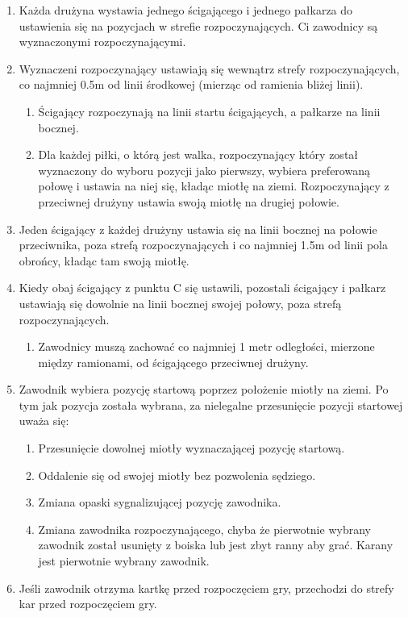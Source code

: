 \documentclass[11pt,a4paper]{article}
\begin{document}
\begin{enumerate}

\item
  Każda drużyna wystawia jednego ścigającego i jednego pałkarza do
  ustawienia się na pozycjach w strefie rozpoczynających. Ci zawodnicy
  są wyznaczonymi rozpoczynającymi.
\item
  Wyznaczeni rozpoczynający ustawiają się wewnątrz strefy
  rozpoczynających, co najmniej 0.5m od linii środkowej (mierząc od
  ramienia bliżej linii).

  \begin{enumerate}
  
  \item
    Ścigający rozpoczynają na linii startu ścigających, a pałkarze na
    linii bocznej.
  \item
    Dla każdej piłki, o którą jest walka, rozpoczynający który został
    wyznaczony do wyboru pozycji jako pierwszy, wybiera preferowaną
    połowę i ustawia na niej się, kładąc miotłę na ziemi. Rozpoczynający
    z przeciwnej drużyny ustawia swoją miotłę na drugiej połowie.
  \end{enumerate}
\item
  Jeden ścigający z każdej drużyny ustawia się na linii bocznej na
  połowie przeciwnika, poza strefą rozpoczynających i co najmniej 1.5m
  od linii pola obrońcy, kładąc tam swoją miotłę.
\item
  Kiedy obaj ścigający z punktu C się ustawili, pozostali ścigający i
  pałkarz ustawiają się dowolnie na linii bocznej swojej połowy, poza
  strefą rozpoczynających.

  \begin{enumerate}
  
  \item
    Zawodnicy muszą zachować co najmniej 1 metr odległości, mierzone
    między ramionami, od ścigającego przeciwnej drużyny.
  \end{enumerate}
\item
  Zawodnik wybiera pozycję startową poprzez położenie miotły na ziemi.
  Po tym jak pozycja została wybrana, za nielegalne przesunięcie pozycji
  startowej uważa się:

  \begin{enumerate}
  
  \item
    Przesunięcie dowolnej miotły wyznaczającej pozycję startową.
  \item
    Oddalenie się od swojej miotły bez pozwolenia sędziego.
  \item
    Zmiana opaski sygnalizującej pozycję zawodnika.
  \item
    Zmiana zawodnika rozpoczynającego, chyba że pierwotnie wybrany
    zawodnik został usunięty z boiska lub jest zbyt ranny aby grać.
    Karany jest pierwotnie wybrany zawodnik.
  \end{enumerate}
\item
  Jeśli zawodnik otrzyma kartkę przed rozpoczęciem gry, przechodzi do
  strefy kar przed rozpoczęciem gry.


\end{enumerate}
\end{document}
